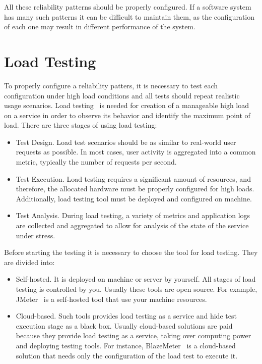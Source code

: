 All these reliability patterns should be properly configured. If a software system has many such patterns it can be difficult to maintain them, as the configuration of each one may result in different performance of the system.

\section{Load Testing}\label{sec:load-testing}
To properly configure a reliability patters, it is necessary to test each configuration under high load conditions and all tests should repeat realistic usage scenarios. Load testing~\cite{load_testing_tips} is needed for creation of a manageable high load on a service in order to observe its behavior and identify the maximum point of load. There are three stages of using load testing:

\begin{itemize}
    \item Test Design. Load test scenarios should be as similar to real-world user requests as possible. In most cases, user activity is aggregated into a common metric, typically the number of requests per second.
    \item Test Execution. Load testing requires a significant amount of resources, and therefore, the allocated hardware must be properly configured for high loads. Additionally, load testing tool must be deployed and configured on machine.
    \item Test Analysis. During load testing, a variety of metrics and application logs are collected and aggregated to allow for analysis of the state of the service under stress.
\end{itemize}

Before starting the testing it is necessary to choose the tool for load testing. They are divided into:
\begin{itemize}
    \item Self-hosted. It is deployed on machine or server by yourself. All stages of load testing is controlled by you. Usually these tools are open source. For example, JMeter~\cite{jmeter} is a self-hosted tool that use your machine resources.
    \item Cloud-based. Such tools provides load testing as a service and hide test execution stage as a black box. Usually cloud-based solutions are paid because they provide load testing as a service, taking over computing power and deploying testing tools. For instance, BlazeMeter~\cite{blazemeter} is a cloud-based solution that needs only the configuration of the load test to execute it.
\end{itemize}

